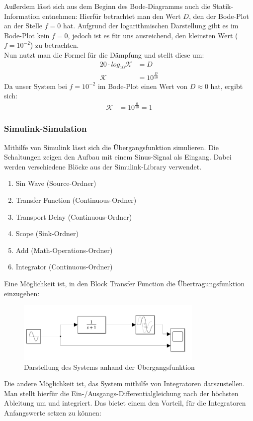  Außerdem lässt sich aus dem Beginn des Bode-Diagramms auch die Statik-Information entnehmen: Hierfür betrachtet man den Wert $D$, den der Bode-Plot an der Stelle $f = 0$ hat. Aufgrund der logarithmischen Darstellung gibt es im Bode-Plot kein $f = 0$, jedoch ist es für uns ausreichend, den kleinsten Wert ($f = 10^{-2}$) zu betrachten. \\
 Nun nutzt man die Formel für die Dämpfung und stellt diese um:
 \begin{align*}
    20 \cdot log_{10} \mathcal{K} &= D \\
    \mathcal{K} &= 10^{\frac{D}{10}}
 \end{align*}
 Da unser System bei $f = 10^{-2}$ im Bode-Plot einen Wert von $D \approx 0$ hat, ergibt sich:
 \begin{align*}
    \mathcal{K} &= 10^{\frac{0}{10}} = 1
\end{align*}

\subsubsection{Simulink-Simulation}
Mithilfe von Simulink lässt sich die Übergangsfunktion simulieren. Die Schaltungen zeigen den Aufbau mit einem Sinus-Signal als Eingang.
Dabei werden verschiedene Blöcke aus der Simulink-Library verwendet. 
\begin{enumerate}
    \item Sin Wave (Source-Ordner)
    \item Transfer Function (Continuous-Ordner)
    \item Transport Delay (Continuous-Ordner)
    \item Scope (Sink-Ordner)
    \item Add (Math-Operations-Ordner)
    \item Integrator (Continuous-Ordner)
\end{enumerate}

Eine Möglichkeit ist, in den Block Transfer Function die Übertragungsfunktion einzugeben:

\begin{figure}[H]
    \centering
    \includegraphics[width=0.8\textwidth]{Bilder/SimulinkEinfach.png}
    \caption{Darstellung des Systems anhand der Übergangsfunktion}
 \end{figure}
Die andere Möglichkeit ist, das System mithilfe von Integratoren darszustellen. Man stellt hierfür die Ein-/Ausgangs-Differentialgleichung nach der höchsten Ableitung um und integriert. Das bietet einem den Vorteil, für die Integratoren Anfangswerte setzen zu können:


